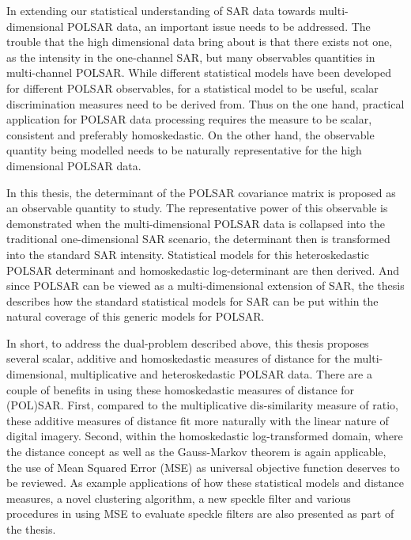 \begin{abstracts}
In extending our statistical understanding of SAR data towards multi-dimensional POLSAR data, an important issue needs to be addressed.
The trouble that the high dimensional data bring about is that there exists not one, as the intensity in the one-channel SAR, but many observables quantities in multi-channel POLSAR.
While different statistical models have been developed for different POLSAR observables,
  for a statistical model to be useful, scalar discrimination measures need to be derived from.
Thus on the one hand, practical application for POLSAR data processing requires the measure to be scalar, consistent and preferably homoskedastic. %
On the other hand, the observable quantity being modelled needs to be naturally representative for the high dimensional POLSAR data.

In this thesis, the determinant of the POLSAR covariance matrix is proposed as an observable quantity to study.
The representative power of this observable is demonstrated when the multi-dimensional POLSAR data is collapsed into the traditional one-dimensional SAR scenario, the determinant then is transformed into the standard SAR intensity.
Statistical models for this heteroskedastic POLSAR determinant and homoskedastic log-determinant are then derived.
And since POLSAR can be viewed as a multi-dimensional extension of SAR, the thesis describes how the standard statistical models for SAR can be put within the natural coverage of this generic models for POLSAR.

In short, to address the dual-problem described above,
  this thesis proposes several scalar, additive and homoskedastic measures of distance for the multi-dimensional, multiplicative and heteroskedastic POLSAR data. 
There are a couple of benefits in using these homoskedastic measures of distance for (POL)SAR.
First, compared to the multiplicative dis-similarity measure of ratio, these additive measures of distance fit more naturally with the linear nature of digital imagery.
Second, within the homoskedastic log-transformed domain, where the distance concept as well as the Gauss-Markov theorem is again applicable,
  the use of Mean Squared Error (MSE) as universal objective function deserves to be reviewed. %
As example applications of how these statistical models and distance measures,
  a novel clustering algorithm, a new speckle filter and various procedures in using MSE to evaluate speckle filters are also presented as part of the thesis.

\end{abstracts}


